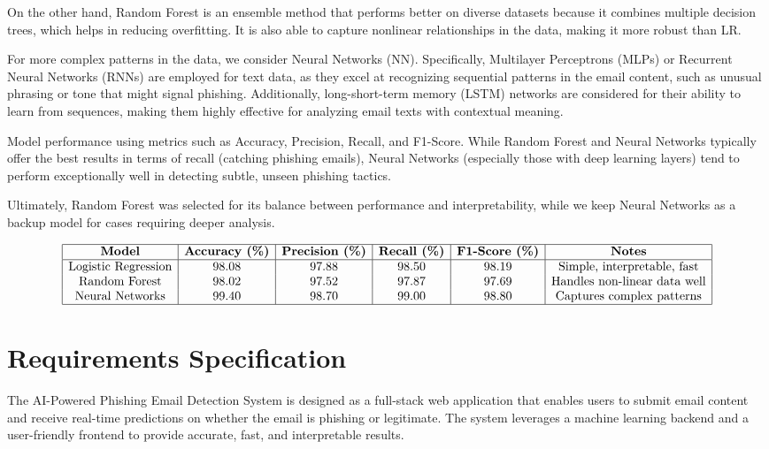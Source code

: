 \documentclass{article}
\begin{document}
On the other hand, Random Forest is an ensemble method that performs better on diverse datasets because it combines multiple decision trees, which helps in reducing overfitting. It is also able to capture nonlinear relationships in the data, making it more robust than LR.

For more complex patterns in the data, we consider Neural Networks (NN). Specifically, Multilayer Perceptrons (MLPs) or Recurrent Neural Networks (RNNs) are employed for text data, as they excel at recognizing sequential patterns in the email content, such as unusual phrasing or tone that might signal phishing. Additionally, long-short-term memory (LSTM) networks are considered for their ability to learn from sequences, making them highly effective for analyzing email texts with contextual meaning.

Model performance using metrics such as Accuracy, Precision, Recall, and F1-Score. While Random Forest and Neural Networks typically offer the best results in terms of recall (catching phishing emails), Neural Networks (especially those with deep learning layers) tend to perform exceptionally well in detecting subtle, unseen phishing tactics.

Ultimately, Random Forest was selected for its balance between performance and interpretability, while we keep Neural Networks as a backup model for cases requiring deeper analysis.

\[
\begin{array}{|c|c|c|c|c|c|}
\hline
\textbf{Model} & \textbf{Accuracy (\%)} & \textbf{Precision (\%)} & \textbf{Recall (\%)} & \textbf{F1-Score (\%)} & \textbf{Notes} \\
\hline
\text{Logistic Regression} & 98.08 & 97.88 & 98.50 & 98.19 & \text{Simple, interpretable, fast} \\
\text{Random Forest} & 98.02 & 97.52 & 97.87 & 97.69 & \text{Handles non-linear data well} \\
\text{Neural Networks} & 99.40 & 98.70 & 99.00 & 98.80 & \text{Captures complex patterns} \\
\hline
\end{array}
\]
\newpage


\section{Requirements Specification}

The AI-Powered Phishing Email Detection System is designed as a full-stack web application that enables users to submit email content and receive real-time predictions on whether the email is phishing or legitimate. The system leverages a machine learning backend and a user-friendly frontend to provide accurate, fast, and interpretable results.
\end{document}
